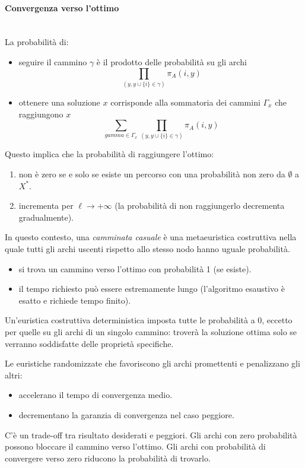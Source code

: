 \documentclass{article}
\begin{document}
\paragraph{Convergenza verso l'ottimo}\mbox{}\\
La probabilità di:
\begin{itemize}
    \item seguire il cammino $\gamma$ è il prodotto delle probabilità su gli archi
          $$\prod_{(y,y\cup\{i\}\in\gamma)}\pi_A(i,y)$$
    \item ottenere una soluzione $x$ corrisponde alla sommatoria dei cammini $\Gamma_x$ che raggiungono
          $x$
          $$\sum_{gamma\in\Gamma_x}\prod_{(y,y\cup\{i\}\in\gamma)}\pi_A(i,y)$$
\end{itemize}
Questo implica che la probabilità di raggiungere l'ottimo:
\begin{enumerate}
    \item non è zero se e solo se esiste un percorso con una probabilità non zero da $\emptyset$ a $X^*$.
    \item incrementa per $\ell\rightarrow +\infty$ (la probabilità di non raggiungerlo decrementa
          gradualmente).
\end{enumerate}
In questo contesto, una \textit{camminata casuale} è una metaeuristica costruttiva nella quale
tutti gli archi uscenti rispetto allo stesso nodo hanno uguale probabilità.
\begin{itemize}
    \item si trova un cammino verso l'ottimo con probabilità 1 (se esiste).
    \item il tempo richiesto può essere estremamente lungo (l'algoritmo esaustivo
          è esatto e richiede tempo finito).
\end{itemize}
Un'euristica costruttiva deterministica imposta tutte le probabilità a 0, eccetto per quelle su gli
archi di un singolo cammino: troverà la soluzione ottima solo se verranno soddisfatte delle proprietà
specifiche.

Le euristiche randomizzate che favoriscono gli archi promettenti e penalizzano gli altri:
\begin{itemize}
    \item accelerano il tempo di convergenza medio.
    \item decrementano la garanzia di convergenza nel caso peggiore.
\end{itemize}
C'è un trade-off tra risultato desiderati e peggiori.
Gli archi con zero probabilità possono bloccare il cammino verso l'ottimo. Gli archi con probabilità
di convergere verso zero riducono la probabilità di trovarlo.
\end{document}
